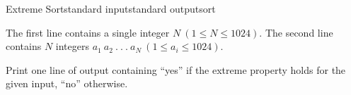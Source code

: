 \begin{problem}{Extreme Sort}{standard input}{standard output}{sort}
\InputFile

The first line contains a single integer $N\ (1 \leq N \leq 1024)$. The second line contains $N$
integers $a_1\ a_2\ .\ .\ .\ a_N\ (1 \leq a_i \leq 1024)$.

\OutputFile

Print one line of output containing ``yes'' if the extreme property holds for the given input,
``no'' otherwise.

\Example

\begin{example}
%
%
\end{example}

\end{problem}
